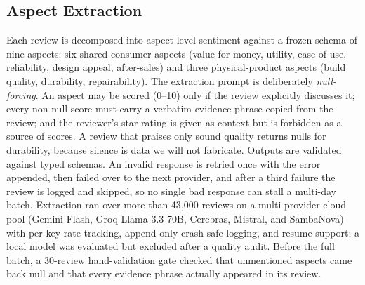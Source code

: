 \documentclass[journal]{IEEEtran}
\begin{document}
\subsection{Aspect Extraction}
Each review is decomposed into aspect-level sentiment against a frozen schema of nine aspects: six shared consumer aspects (value for money, utility, ease of use, reliability, design appeal, after-sales) and three physical-product aspects (build quality, durability, repairability). The extraction prompt is deliberately \emph{null-forcing}. An aspect may be scored (0--10) only if the review explicitly discusses it; every non-null score must carry a verbatim evidence phrase copied from the review; and the reviewer's star rating is given as context but is forbidden as a source of scores. A review that praises only sound quality returns nulls for durability, because silence is data we will not fabricate. Outputs are validated against typed schemas. An invalid response is retried once with the error appended, then failed over to the next provider, and after a third failure the review is logged and skipped, so no single bad response can stall a multi-day batch. Extraction ran over more than 43{,}000 reviews on a multi-provider cloud pool (Gemini Flash, Groq Llama-3.3-70B, Cerebras, Mistral, and SambaNova) with per-key rate tracking, append-only crash-safe logging, and resume support; a local model was evaluated but excluded after a quality audit. Before the full batch, a 30-review hand-validation gate checked that unmentioned aspects came back null and that every evidence phrase actually appeared in its review.
\end{document}
